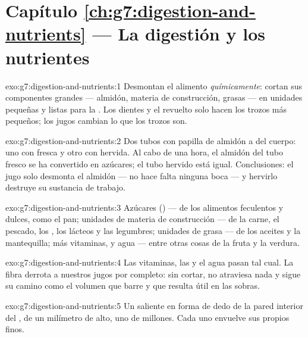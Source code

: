 \section*{Capítulo \ref{ch:g7:digestion-and-nutrients} --- La digestión y los nutrientes}

\begin{solution}{exo:g7:digestion-and-nutrients:1}
Desmontan el alimento \emph{químicamente}: cortan sus componentes
grandes --- almidón, materia de construcción, grasas --- en unidades
pequeñas y listas para la . Los dientes y el revuelto solo hacen
los trozos más pequeños; los jugos cambian lo que los trozos son.
\end{solution}

\begin{solution}{exo:g7:digestion-and-nutrients:2}
Dos tubos con papilla de almidón a  del cuerpo: uno con
 fresca y otro con  hervida. Al cabo de una hora, el
almidón del tubo fresco se ha convertido en azúcares; el tubo hervido
está igual. Conclusiones: el jugo solo desmonta el almidón --- no hace
falta ninguna boca --- y hervirlo destruye su sustancia de trabajo.
\end{solution}

\begin{solution}{exo:g7:digestion-and-nutrients:3}
Azúcares () --- de los alimentos feculentos y dulces, como el
pan; unidades de materia de construcción --- de la carne, el pescado,
los , los lácteos y las legumbres; unidades de grasa --- de los
aceites y la mantequilla; más vitaminas,  y agua ---
entre otras cosas de la fruta y la verdura.
\end{solution}

\begin{solution}{exo:g7:digestion-and-nutrients:4}
Las vitaminas, las  y el agua pasan tal cual. La fibra
derrota a nuestros jugos por completo: sin cortar, no atraviesa nada y
sigue su camino como el volumen que barre y que resulta útil en las
sobras.
\end{solution}

\begin{solution}{exo:g7:digestion-and-nutrients:5}
Un saliente en forma de dedo de la pared interior del , de un milímetro de alto, uno de millones. Cada uno envuelve
sus propios  finos.
\end{solution}

